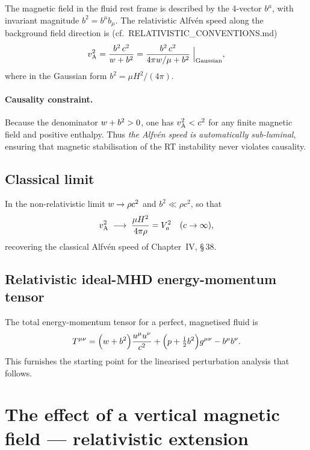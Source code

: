 The magnetic field in the fluid rest frame is described by the 4-vector
$b^{\mu}$, with invariant magnitude $b^{2}=b^{\mu}b_{\mu}$.  The
relativistic Alfv\'en speed along the background field direction is
(cf.~RELATIVISTIC\_CONVENTIONS.md)
\begin{equation}
  v_{\mathrm{A}}^{2}
    = \frac{b^{2}\,c^{2}}{w + b^{2}}
    = \frac{b^{2}\,c^{2}}{4\pi w/\mu + b^{2}}\;\Big|_{\text{Gaussian}},
  \label{eq:rel96-vA}
\end{equation}
where in the Gaussian form $b^{2}=\mu H^{2}/(4\pi)$.

\paragraph{Causality constraint.}
Because the denominator $w + b^{2}>0$, one has
$v_{\mathrm{A}}^{2}<c^{2}$ for any finite magnetic field and positive enthalpy.
Thus \emph{the Alfv\'en speed is automatically sub-luminal}, ensuring
that magnetic stabilisation of the RT instability never violates
causality.

\subsection{Classical limit}

In the non-relativistic limit $w\to\rho c^{2}$ and
$b^{2}\ll\rho c^{2}$, so that
\begin{equation}
  v_{\mathrm{A}}^{2}\;\longrightarrow\;
  \frac{\mu H^{2}}{4\pi\rho}
  = V_{a}^{2}\quad(c\to\infty),
  \label{eq:rel96-vA-NR}
\end{equation}
recovering the classical Alfv\'en speed of Chapter~IV, \S\,38.

\subsection{Relativistic ideal-MHD energy-momentum tensor}

The total energy-momentum tensor for a perfect, magnetised fluid is
\begin{equation}
  T^{\mu\nu}
    = \Bigl(w + b^{2}\Bigr)\frac{u^{\mu}u^{\nu}}{c^{2}}
      + \Bigl(p + \tfrac{1}{2}b^{2}\Bigr)g^{\mu\nu}
      - b^{\mu}b^{\nu}.
  \label{eq:rel96-Tmunu}
\end{equation}
This furnishes the starting point for the linearised perturbation
analysis that follows.

\section{The effect of a vertical magnetic field --- relativistic
  extension}\label{sec:rel-96}

